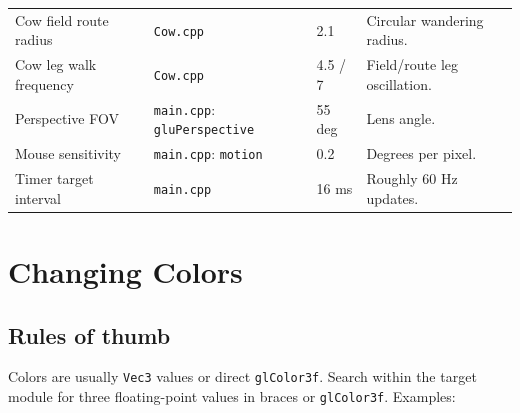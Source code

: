 \documentclass[11pt,a4paper,openany]{book}
\newcommand{\code}[1]{\texttt{#1}}
\newcommand{\file}[1]{\nolinkurl{#1}}
\begin{document}
\begin{longtable}{@{}p{}p{}p{}p{}@{}}
	Cow field route radius     & \file{Cow.cpp}                          & 2.1               & Circular wandering radius.                                                               \\
	Cow leg walk frequency     & \file{Cow.cpp}                          & 4.5 / 7           & Field/route leg oscillation.                                                             \\
	Perspective FOV            & \file{main.cpp}: \code{gluPerspective}  & 55 deg            & Lens angle.                                                                              \\
	Mouse sensitivity          & \file{main.cpp}: \code{motion}          & 0.2               & Degrees per pixel.                                                                       \\
	Timer target interval      & \file{main.cpp}                         & 16 ms             & Roughly 60 Hz updates.                                                                   \\
	\bottomrule
\end{longtable}

\chapter{Changing Colors}
\section{Rules of thumb}
Colors are usually \code{Vec3} values or direct \code{glColor3f}. Search within the target module for three floating-point values in braces or \code{glColor3f}. Examples:
\end{document}
